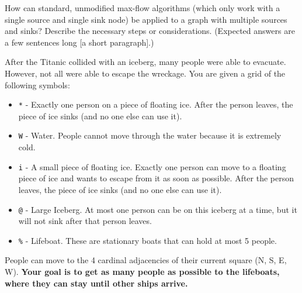 \documentclass[12pt]{exam}
\begin{document}
\begin{questions}

\clearpage

\question[15] [W5] How can standard, unmodified max-flow algorithms (which only work with a single source and single sink node) be applied to a graph with multiple sources and sinks? Describe the necessary steps or considerations. (Expected answers are a few sentences long [a short paragraph].)


\clearpage

\question[40] [W5] 
After the Titanic collided with an iceberg, many people were able to evacuate.
However, not all were able to escape the wreckage.
You are given a grid of the following symbols:
\begin{itemize}
    \item \texttt{*} - Exactly one person on a piece of floating ice.
    After the person leaves, the piece of ice sinks (and no one else can use it).
    \item \texttt{W} - Water. People cannot move through the water because it is extremely cold.
    \item \texttt{i} - A small piece of floating ice. Exactly one person can move to a floating piece of ice and wants to escape from it as soon as possible. After the person leaves, the piece of ice sinks (and no one else can use it).
    \item \texttt{@} - Large Iceberg. At most one person can be on this iceberg at a time, but it will not sink after that person leaves.
    \item \texttt{\%} - Lifeboat. These are stationary boats that can hold at most 5 people.
\end{itemize}
People can move to the 4 cardinal adjacencies of their current square (N, S, E, W).
\textbf{Your goal is to get as many people as possible to the lifeboats, where they can stay until other ships arrive.}


\end{questions}
\end{document}
